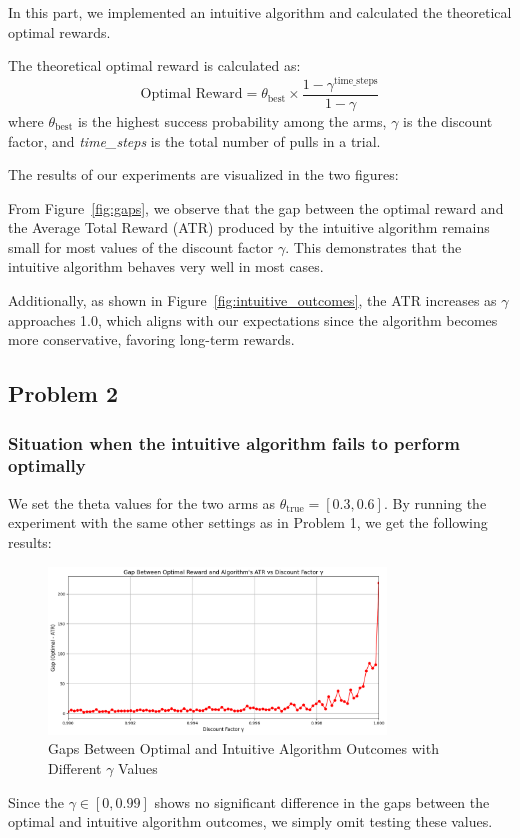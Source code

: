 \documentclass[11pt]{article}
\begin{document}
In this part, we implemented an intuitive algorithm and calculated the theoretical optimal rewards. 

The theoretical optimal reward is calculated as:
\[
\text{Optimal Reward} = \theta_{\text{best}} \times \frac{1-\gamma^{\text{time\_steps}}}{1-\gamma}
\]
where $\theta_{\text{best}}$ is the highest success probability among the arms, $\gamma$ is the discount factor, and \textit{time\_steps} is the total number of pulls in a trial.

The results of our experiments are visualized in the two figures:

From Figure~\ref{fig:gaps}, we observe that the gap between the optimal reward and the Average Total Reward (ATR) produced by the intuitive algorithm remains small for most values of the discount factor $\gamma$. This demonstrates that the intuitive algorithm behaves very well in most cases.

Additionally, as shown in Figure~\ref{fig:intuitive_outcomes}, the ATR increases as $\gamma$ approaches 1.0, which aligns with our expectations since the algorithm becomes more conservative, favoring long-term rewards.

\newpage
\subsection{Problem 2}
\subsubsection*{Situation when the intuitive algorithm fails to perform optimally}
We set the theta values for the two arms as $\theta_{\text{true}} = [0.3, 0.6]$. 
By running the experiment with the same other settings as in Problem 1, we get the following results:
\begin{figure}[H]
    \centering
    \includegraphics[width=0.8\textwidth]{pics/gaps2.png}
    \caption{Gaps Between Optimal and Intuitive Algorithm Outcomes with Different $\gamma$ Values}
    \label{fig:intuitive_fail}
\end{figure}
Since the $\gamma \in [0, 0.99]$ shows no significant difference in the gaps between the optimal and intuitive algorithm outcomes, we simply omit testing these values.
\end{document}
